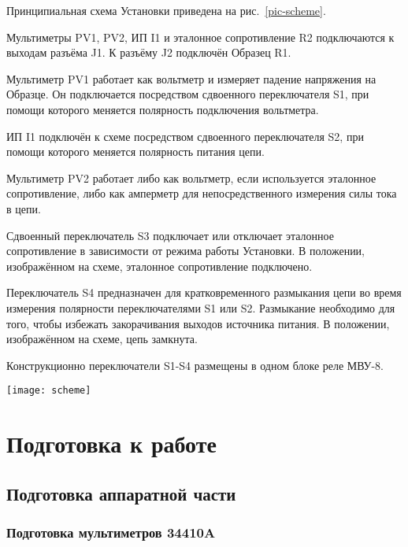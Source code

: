 \documentclass[12pt, a4paper, twocolumn]{report}
\begin{document}
Принципиальная схема Установки приведена на рис.~\ref{pic-scheme}.

Мультиметры PV1, PV2, ИП I1 и эталонное сопротивление R2 подключаются к выходам разъёма J1. К разъёму J2 подключён Образец R1.

Мультиметр PV1 работает как вольтметр и измеряет падение напряжения на Образце. Он подключается посредством сдвоенного переключателя S1, при помощи которого меняется полярность подключения вольтметра.

ИП I1 подключён к схеме посредством сдвоенного переключателя S2, при помощи которого меняется полярность питания цепи.

Мультиметр PV2 работает либо как вольтметр, если используется эталонное сопротивление, либо как амперметр для непосредственного измерения силы тока в цепи.

Сдвоенный переключатель S3 подключает или отключает эталонное сопротивление в зависимости от режима работы Установки. В положении, изображённом на схеме, эталонное сопротивление подключено.

Переключатель S4 предназначен для кратковременного размыкания цепи во время измерения полярности переключателями S1 или S2. Размыкание необходимо для того, чтобы избежать закорачивания выходов источника питания. В положении, изображённом на схеме, цепь замкнута.

Конструкционно переключатели S1-S4 размещены в одном блоке реле МВУ-8.

\begin{figure*}
\begin{center}
\texttt{[image: scheme]}
\end{center}
\caption{Принципиальная схема Установки}
\label{pic-scheme}
\end{figure*}

\chapter{Подготовка к работе}

\section{Подготовка аппаратной части}

\subsection{Подготовка мультиметров 34410A}
\end{document}
